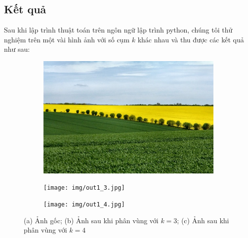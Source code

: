 \documentclass{article}
\begin{document}
    \subsection{Kết quả}
    Sau khi lập trình thuật toán trên ngôn ngữ lập trình python, chúng tôi thử nghiệm trên một vài hình ảnh với số cụm $k$ khác nhau và thu được các kết quả như sau:
    \begin{figure}[H]
        \centering
        \begin{subfigure}[b]{0.3\textwidth}
            \centering
            \includegraphics[width=\textwidth,height=\textheight,keepaspectratio]{img/in1.jpg}
            \caption{}
        \end{subfigure}
        \begin{subfigure}[b]{0.3\textwidth}
            \centering
            \texttt{[image: img/out1\_3.jpg]}
            \caption{}
        \end{subfigure}
         \begin{subfigure}[b]{0.3\textwidth}
            \centering
            \texttt{[image: img/out1\_4.jpg]}
            \caption{}
        \end{subfigure}
        \caption{(a) Ảnh gốc; (b) Ảnh sau khi phân vùng với $k=3$; (c) Ảnh sau khi phân vùng với $k=4$}
    \end{figure}
\end{document}
